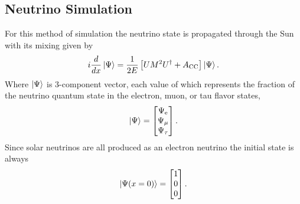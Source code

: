 
\subsection{Neutrino Simulation}
For this method of simulation the neutrino state is propagated through the
Sun with its mixing given by
\begin{equation}
    i\frac{d}{dx}\ket{\Psi} =\frac{1}{2E}\left[UM^{2}U^{\dagger} + A_{\mathrm{CC}}\right]\ket{\Psi}\text{.}
    \label{eqn:mixing_schrodinger}
\end{equation}
Where $\ket{\Psi}$ is 3-component vector, each value of which represents
the fraction of the neutrino quantum state in the electron, muon, or tau flavor states,
\begin{equation}
\ket{\Psi} = 
\begin{bmatrix}
    \Psi_{\mathrm{e}}\\
    \Psi_{\mathrm{\mu}}\\
    \Psi_{\mathrm{\tau}}\\
\end{bmatrix}\mathrm{.}
\end{equation}
Since solar neutrinos are all produced as an electron neutrino the
initial state is always
\begin{equation}
\ket{\Psi(x=0)} = 
\begin{bmatrix}
1\\
0\\
0\\
\end{bmatrix}\mathrm{.}
\end{equation}

